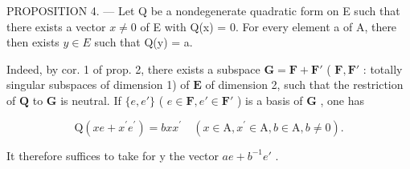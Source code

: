 PROPOSITION 4. --- Let Q be a nondegenerate quadratic form on E such that there exists a vector \(x \neq 0\) of E with Q(x) = 0. For every element a of A, there then exists \(y \in E\) such that Q(y) = a.

Indeed, by cor. 1 of prop. 2, there exists a subspace \(\mathbf{G} = \mathbf{F} + \mathbf{F}'\) ( \(\mathbf{F}, \mathbf{F}'\) : totally singular subspaces of dimension 1) of \(\mathbf{E}\) of dimension 2, such that the restriction of \(\mathbf{Q}\) to \(\mathbf{G}\) is neutral. If \(\{e, e'\}\) ( \(e \in \mathbf{F}, e' \in \mathbf{F}'\) ) is a basis of \(\mathbf{G}\) , one has

\[
\mathrm{Q} (x e + x ^ {\prime} e ^ {\prime}) = b x x ^ {\prime} \quad (x \in \mathrm{A}, x ^ {\prime} \in \mathrm{A}, b \in \mathrm{A}, b \neq 0).
\]

It therefore suffices to take for y the vector \(ae + b^{-1}e'\) .

